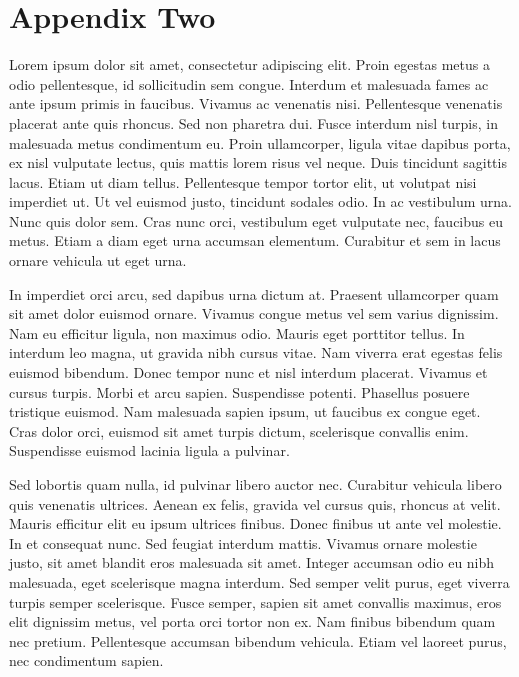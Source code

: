 \documentclass[12pt]{article}
\begin{document}


\newpage
\section{Appendix Two
\label{sec:appendix:two}}
\renewcommand{\thetable}{C\arabic{table}}
\setcounter{table}{0}
\renewcommand{\thefigure}{C\arabic{figure}}
\setcounter{figure}{0}

Lorem ipsum dolor sit amet, consectetur adipiscing elit. Proin egestas metus a odio pellentesque, id sollicitudin sem congue. Interdum et malesuada fames ac ante ipsum primis in faucibus. Vivamus ac venenatis nisi. Pellentesque venenatis placerat ante quis rhoncus. Sed non pharetra dui. Fusce interdum nisl turpis, in malesuada metus condimentum eu. Proin ullamcorper, ligula vitae dapibus porta, ex nisl vulputate lectus, quis mattis lorem risus vel neque. Duis tincidunt sagittis lacus. Etiam ut diam tellus. Pellentesque tempor tortor elit, ut volutpat nisi imperdiet ut. Ut vel euismod justo, tincidunt sodales odio. In ac vestibulum urna. Nunc quis dolor sem. Cras nunc orci, vestibulum eget vulputate nec, faucibus eu metus. Etiam a diam eget urna accumsan elementum. Curabitur et sem in lacus ornare vehicula ut eget urna.

In imperdiet orci arcu, sed dapibus urna dictum at. Praesent ullamcorper quam sit amet dolor euismod ornare. Vivamus congue metus vel sem varius dignissim. Nam eu efficitur ligula, non maximus odio. Mauris eget porttitor tellus. In interdum leo magna, ut gravida nibh cursus vitae. Nam viverra erat egestas felis euismod bibendum. Donec tempor nunc et nisl interdum placerat. Vivamus et cursus turpis. Morbi et arcu sapien. Suspendisse potenti. Phasellus posuere tristique euismod. Nam malesuada sapien ipsum, ut faucibus ex congue eget. Cras dolor orci, euismod sit amet turpis dictum, scelerisque convallis enim. Suspendisse euismod lacinia ligula a pulvinar.

Sed lobortis quam nulla, id pulvinar libero auctor nec. Curabitur vehicula libero quis venenatis ultrices. Aenean ex felis, gravida vel cursus quis, rhoncus at velit. Mauris efficitur elit eu ipsum ultrices finibus. Donec finibus ut ante vel molestie. In et consequat nunc. Sed feugiat interdum mattis. Vivamus ornare molestie justo, sit amet blandit eros malesuada sit amet. Integer accumsan odio eu nibh malesuada, eget scelerisque magna interdum. Sed semper velit purus, eget viverra turpis semper scelerisque. Fusce semper, sapien sit amet convallis maximus, eros elit dignissim metus, vel porta orci tortor non ex. Nam finibus bibendum quam nec pretium. Pellentesque accumsan bibendum vehicula. Etiam vel laoreet purus, nec condimentum sapien.
\end{document}
